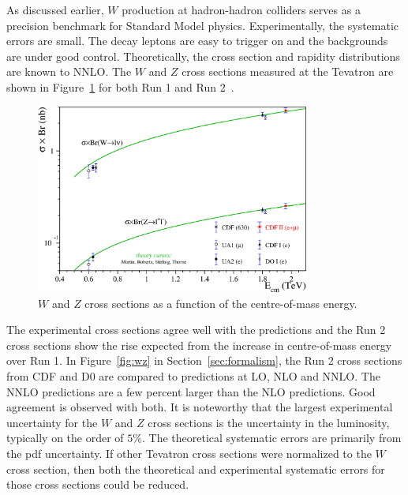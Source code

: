 \documentclass[12pt]{iopart}
\begin{document}
As discussed earlier, $W$ production at hadron-hadron colliders serves as a precision benchmark for Standard Model physics.
Experimentally, the systematic errors are small.  The decay leptons are easy to trigger on and the backgrounds are under good
control. Theoretically, the cross section and rapidity distributions are known to NNLO. The $W$ and $Z$ cross sections measured at the
Tevatron are shown in Figure~\ref{fig:cs_vs_e} for both Run 1 and Run 2~\cite{Acosta:2004uq}.
%
\begin{figure}[b]
\begin{center}
\includegraphics[width=9cm]{cs_vs_e.eps}
\end{center}
\vspace*{-0.5cm}
\caption{
$W$ and $Z$ cross sections as a function of the centre-of-mass energy.
\label{fig:cs_vs_e}}
\end{figure}
%
The experimental cross sections agree well with the predictions and the Run 2 cross sections show the rise expected from the increase
in centre-of-mass energy over Run 1. In Figure~\ref{fig:wz} in Section~\ref{sec:formalism}, the Run 2 cross sections from CDF and D0 are compared to
predictions at LO, NLO and NNLO. The NNLO predictions are a few percent larger than the NLO predictions. Good agreement is observed
with both. It is noteworthy that the largest experimental uncertainty for the $W$ and $Z$ cross sections is the uncertainty in the
luminosity, typically on the order of $5\%$. The theoretical systematic errors are primarily from  the pdf uncertainty. If other
Tevatron cross sections were normalized to the $W$ cross section, then both the theoretical and experimental systematic errors for those
cross sections could be reduced.  

%
%
%
\end{document}
